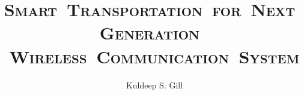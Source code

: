 \documentclass[11pt]{mvlthesis}
\title{\scshape \mbox{Smart Transportation for Next Generation }\\
\scshape \mbox{Wireless Communication System}}
\author{Kuldeep S. Gill}
\begin{document}
\maketitle
\begin{abstract}



\end{abstract}

\begin{acknowledgements}



\end{acknowledgements}

\tableofcontents
\listoffigures
\listoftables



%















\appendix


\end{document}
